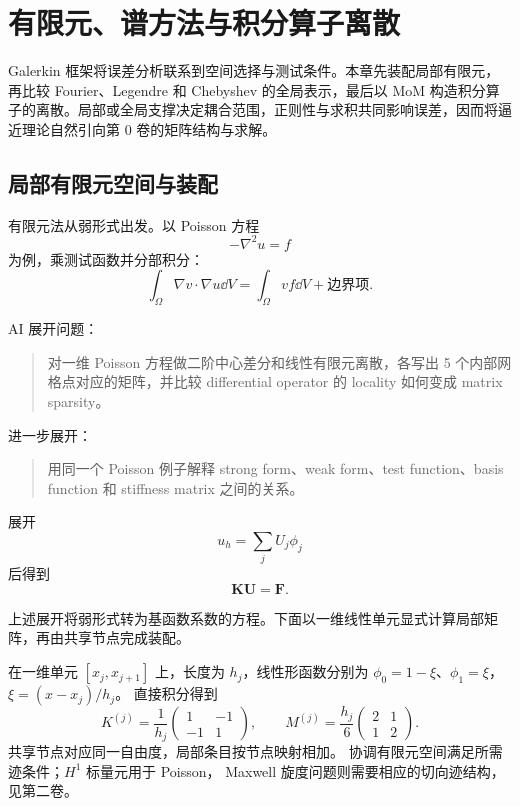 \chapter{有限元、谱方法与积分算子离散}\label{ch:9}
\begin{chaptersummary}
Galerkin 框架将误差分析联系到空间选择与测试条件。本章先装配局部有限元，再比较 Fourier、Legendre 和 Chebyshev 的全局表示，最后以 MoM 构造积分算子的离散。局部或全局支撑决定耦合范围，正则性与求积共同影响误差，因而将逼近理论自然引向第 0 卷的矩阵结构与求解。
\end{chaptersummary}
\section{局部有限元空间与装配}
有限元法从弱形式出发。以 Poisson 方程
\[
-\nabla^2u=f
\]
为例，乘测试函数并分部积分：
\[
\int_\Omega\nabla v\cdot\nabla u\dd V
=
\int_\Omega vf\dd V+\text{边界项}.
\]

\begin{askai}
AI 展开问题：
\begin{quote}
对一维 Poisson 方程做二阶中心差分和线性有限元离散，各写出 5 个内部网格点对应的矩阵，并比较 differential operator 的 locality 如何变成 matrix sparsity。
\end{quote}

进一步展开：
\begin{quote}
用同一个 Poisson 例子解释 strong form、weak form、test function、basis function 和 stiffness matrix 之间的关系。
\end{quote}
\end{askai}

展开
\[
u_h=\sum_jU_j\phi_j
\]
后得到
\[
\bm K\bm U=\bm F.
\]

上述展开将弱形式转为基函数系数的方程。下面以一维线性单元显式计算局部矩阵，再由共享节点完成装配。


在一维单元 $[x_j,x_{j+1}]$ 上，长度为 $h_j$，线性形函数分别为
$\phi_0=1-\xi$、$\phi_1=\xi$，$\xi=(x-x_j)/h_j$。
直接积分得到
\[
K^{(j)}=\frac1{h_j}\begin{pmatrix}1&-1\\-1&1\end{pmatrix},
\qquad
M^{(j)}=\frac{h_j}6\begin{pmatrix}2&1\\1&2\end{pmatrix}.
\]
共享节点对应同一自由度，局部条目按节点映射相加。
协调有限元空间满足所需迹条件；$H^1$ 标量元用于 Poisson，
Maxwell 旋度问题则需要相应的切向迹结构，见第二卷。

